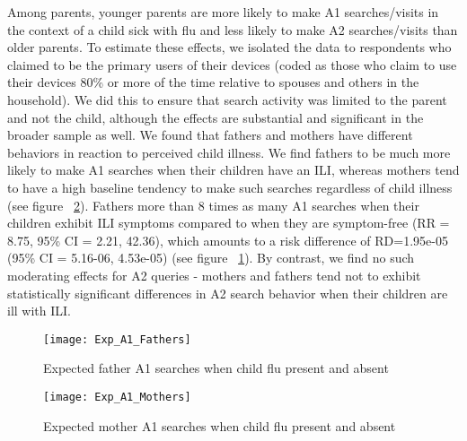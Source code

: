 \documentclass[12pt]{article}
\begin{document}
Among parents, younger parents are more likely to make A1 searches/visits in the context of a child sick with flu and less likely to make A2 searches/visits than older parents. To estimate these effects, we isolated the data to respondents who claimed to be the primary users of their devices (coded as those who claim to use their devices 80\% or more of the time relative to spouses and others in the household). We did this to ensure that search activity was limited to the parent and not the child, although the effects are substantial and significant in the broader sample as well. We found that fathers and mothers have different behaviors in reaction to perceived child illness. We find fathers to be much more likely to make A1 searches when their children have an ILI, whereas mothers tend to have a high baseline tendency to make such searches regardless of child illness (see figure ~\ref{mothers_a1}). Fathers more than 8 times as many A1 searches when their children exhibit ILI symptoms compared to when they are symptom-free (RR = 8.75, 95\% CI = 2.21, 42.36), which amounts to a risk difference of RD=1.95e-05 (95\% CI = 5.16-06, 4.53e-05) (see figure ~\ref{fathers_a1}). By contrast, we find no such moderating effects for A2 queries - mothers and fathers tend not to exhibit statistically significant differences in A2 search behavior when their children are ill with ILI.  

\begin{figure}[!htbp]
\begin{centering}
   \texttt{[image: Exp\_A1\_Fathers]}
  \caption{Expected father A1 searches when child flu present and absent}
\label{fathers_a1}
\end{centering}
\end{figure}

\begin{figure}[!htbp]
\begin{centering}
   \texttt{[image: Exp\_A1\_Mothers]}
  \caption{Expected mother A1 searches when child flu present and absent}
\label{mothers_a1}
\end{centering}
\end{figure}
\end{document}
